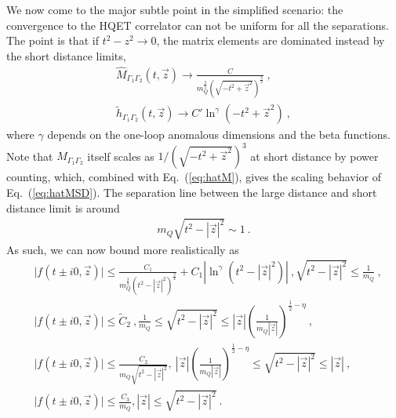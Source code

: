 \documentclass[a4paper,11pt]{article}
\begin{document}
We now come to the major subtle point in the simplified scenario: the convergence to the HQET correlator can not be uniform for all the separations. The point is that if $t^2-z^2\rightarrow0$, the matrix elements are dominated instead by the short distance limits,
\begin{align}
\hat M_{\Gamma_1\Gamma_2}(t,\vec{z})\rightarrow\frac{C}{m_Q^{\frac{3}{2}}\left(\sqrt{-t^2+\vec{z}^2}\right)^{\frac{3}{2}}} \ , \label{eq:hatMSD} \\
\tilde h_{\Gamma_1\Gamma_2}(t,\vec{z})\rightarrow C'\ln^{\gamma}(-t^2+\vec{z}^2) \ ,  
\end{align}
where $\gamma$ depends on the one-loop anomalous dimensions and the beta functions. Note that $M_{\Gamma_1 \Gamma_2}$ itself scales as $1/\left(\sqrt{-t^2+\vec{z}^2}\right)^3$ at short distance by power counting, which, combined with Eq.~(\ref{eq:hatM}), gives the scaling behavior of Eq.~(\ref{eq:hatMSD}). The separation line between the large distance and short distance limit is around
\begin{align}
m_Q\sqrt{t^2-|\vec{z}|^2} \sim 1 \ .
\end{align}
As such, we can now bound more realistically as 
\begin{align}
&\bigg|f(t\pm i0,\vec{z})\bigg|\le \frac{C_1}{m_Q^{\frac{3}{2}}(t^2-|\vec{z}|^2)^{\frac{3}{4}}} +C_1|\ln^{\gamma}(t^2-|\vec{z}|^2)| \ , \sqrt{t^2-|\vec{z}|^2} \le \frac{1}{m_Q} \ , \label{eq:neq1} \\
& \bigg|f(t\pm i0,\vec{z})\bigg| \le \tilde C_2 \ , \frac{1}{m_Q}\le \sqrt{t^2-|\vec{z}|^2}\le |\vec{z}|\left(\frac{1}{m_Q |\vec{z}|}\right)^{\frac{1}{2}-\eta} \ , \label{eq:neq2} \\
&\bigg|f(t \pm i0,\vec{z})\bigg|\le \frac{C_2}{m_Q\sqrt{t^2-|\vec{z}|^2}} , \  |\vec{z}|\left(\frac{1}{m_Q |\vec{z}|}\right)^{\frac{1}{2}-\eta}\le \sqrt{t^2-|\vec{z}|^2}\le |\vec{z}| \ , \label{eq:neq3} \\
&\bigg|f(t \pm i0,\vec{z})\bigg|\le \frac{C_3}{m_Q}, |\vec{z}|\le \sqrt{t^2-|\vec{z}|^2} \ . \label{eq:neq4}
\end{align}
\end{document}
